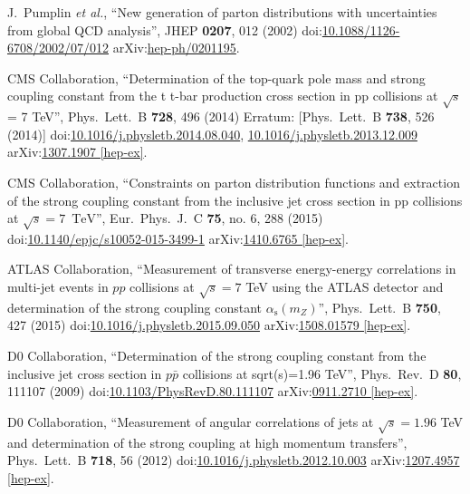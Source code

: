 \begin{thebibliography}{99}
J.~Pumplin {\it et al.}, ``New generation of parton distributions with uncertainties from global QCD analysis'', JHEP {\bf 0207}, 012 (2002) doi:\href{http://dx.doi.org/10.1088/1126-6708/2002/07/012}{10.1088/1126-6708/2002/07/012} arXiv:\href{https://arxiv.org/abs/hep-ph/0201195}{hep-ph/0201195}.



 CMS Collaboration, ``Determination of the top-quark pole mass and strong coupling constant from the t t-bar production cross section in pp collisions at $\sqrt{s}$ = 7 TeV'', Phys.\ Lett.\ B {\bf 728}, 496 (2014) Erratum: [Phys.\ Lett.\ B {\bf 738}, 526 (2014)] doi:\href{http://dx.doi.org/10.1016/j.physletb.2014.08.040}{10.1016/j.physletb.2014.08.040}, \href{http://dx.doi.org/10.1016/j.physletb.2013.12.009}{10.1016/j.physletb.2013.12.009} arXiv:\href{https://arxiv.org/abs/1307.1907}{1307.1907 [hep-ex]}.

CMS Collaboration, ``Constraints on parton distribution functions and extraction of the strong coupling constant from the inclusive jet cross section in pp collisions at $\sqrt{s} = 7$ $\,\text {TeV}$'', Eur.\ Phys.\ J.\ C {\bf 75}, no. 6, 288 (2015) doi:\href{http://dx.doi.org/10.1140/epjc/s10052-015-3499-1}{10.1140/epjc/s10052-015-3499-1} arXiv:\href{https://arxiv.org/abs/1410.6765}{1410.6765 [hep-ex]}.

ATLAS Collaboration, ``Measurement of transverse energy-energy correlations in multi-jet events in $pp$ collisions at $\sqrt{s} = 7$ TeV using the ATLAS detector and determination of the strong coupling constant $\alpha_{\mathrm{s}}(m_Z)$'', Phys.\ Lett.\ B {\bf 750}, 427 (2015) doi:\href{http://dx.doi.org/10.1016/j.physletb.2015.09.050}{10.1016/j.physletb.2015.09.050} arXiv:\href{https://arxiv.org/abs/1508.01579}{1508.01579 [hep-ex]}.

D0 Collaboration, ``Determination of the strong coupling constant from the inclusive jet cross section in $p\bar{p}$ collisions at sqrt(s)=1.96 TeV'', Phys.\ Rev.\ D {\bf 80}, 111107 (2009) doi:\href{http://dx.doi.org/10.1103/PhysRevD.80.111107}{10.1103/PhysRevD.80.111107} arXiv:\href{https://arxiv.org/abs/0911.2710}{0911.2710 [hep-ex]}.

D0 Collaboration, ``Measurement of angular correlations of jets at $\sqrt{s}=1.96$ TeV and determination of the strong coupling at high momentum transfers'', Phys.\ Lett.\ B {\bf 718}, 56 (2012) doi:\href{http://dx.doi.org/10.1016/j.physletb.2012.10.003}{10.1016/j.physletb.2012.10.003} arXiv:\href{https://arxiv.org/abs/1207.4957}{1207.4957 [hep-ex]}.


\end{thebibliography}
